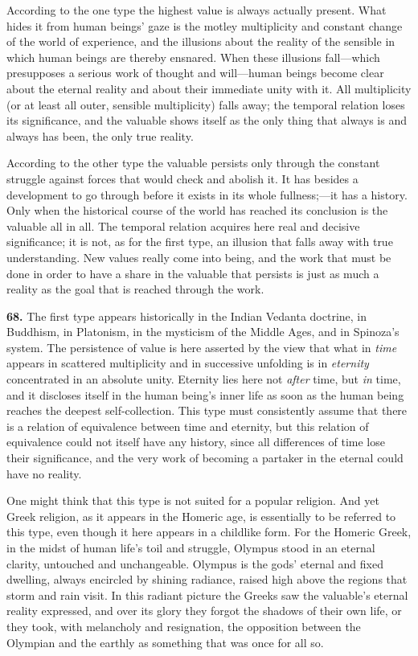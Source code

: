 \documentclass[12pt,a4paper]{book}
\newcommand{\opage}[1]{\marginnote{\footnotesize\textit{[#1]}}}
\begin{document}
According to the one type the highest value is always actually present. What hides it from
human beings' gaze is the motley multiplicity and constant change of the world of experience,
and the illusions about the reality of the sensible in which human beings are thereby ensnared.
When these illusions fall---which presupposes a serious work of thought and will---human beings
become clear about the eternal reality and about their immediate unity with it. All multiplicity
(or at least all outer, sensible multiplicity) falls away; the temporal relation loses its
significance, and the valuable shows itself as the only thing that always is and always has
been, the only true reality.

According to the other type the valuable persists only through the constant struggle against
forces that would check and abolish it. It has besides a development to go through before it
exists in its whole fullness;---it has a history. Only when the historical course of the world
has reached its conclusion is the valuable all in all. The 
\opage{155}temporal relation acquires here real
and decisive significance; it is not, as for the first type, an illusion that falls away with
true understanding. New values really come into being, and the work that must be done in order
to have a share in the valuable that persists is just as much a reality as the goal that is
reached through the work.

\medskip

\noindent\textbf{68.} The first type appears historically in the Indian Vedanta doctrine, in
Buddhism, in Platonism, in the mysticism of the Middle Ages, and in Spinoza's system. The
persistence of value is here asserted by the view that what in \emph{time} appears in scattered
multiplicity and in successive unfolding is in \emph{eternity} concentrated in an absolute unity.
Eternity lies here not \emph{after} time, but \emph{in} time, and it discloses itself in the human
being's inner life as soon as the human being reaches the deepest self-collection. This type must
consistently assume that there is a relation of equivalence between time and eternity, but this
relation of equivalence could not itself have any history, since all differences of time lose their
significance, and the very work of becoming a partaker in the eternal could have no reality.

One might think that this type is not suited for a popular religion. And yet Greek religion, as it
appears in the Homeric age, is essentially to be referred to this type, even though it here appears
in a childlike form. For the Homeric Greek, in the midst of human life's toil and struggle, Olympus
stood in an eternal clarity, untouched and unchangeable. Olympus is the gods' eternal and fixed
dwelling, always encircled by shining radiance, raised high above the regions that storm and rain
visit. In this radiant picture the Greeks saw the valuable's eternal reality expressed, and over its
glory they forgot the shadows of their own life, or they took, with melancholy and resignation, the
opposition between the Olympian and the earthly as something that was once for all so.
\end{document}
